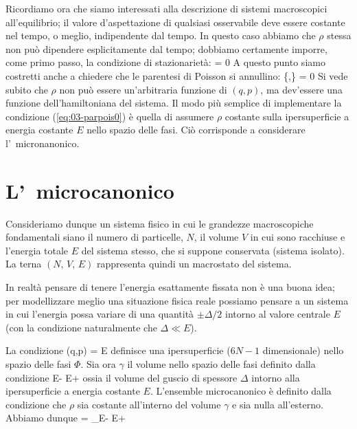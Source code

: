 Ricordiamo ora che siamo interessati alla descrizione di sistemi macroscopici all'equilibrio; il valore d'aspettazione di qualsiasi osservabile deve essere costante nel tempo, o meglio, indipendente dal tempo. In questo caso abbiamo che $\rho$ stessa non può dipendere esplicitamente dal tempo; dobbiamo certamente imporre, come primo passo, la condizione di stazionarietà:
\be
{} = 0
\ee
A questo punto siamo costretti anche a chiedere che le parentesi di Poisson si annullino:
\be
\label{eq:03-parpois0}
\{\rho,\Ham\} = 0
\ee
Si vede subito che $\rho$ non può essere un'arbitraria funzione di $(q,p)$, ma dev'essere una funzione dell'hamiltoniana del sistema. Il modo più semplice di implementare la condizione (\ref{eq:03-parpois0}) è quella di assumere $\rho$ costante sulla ipersuperficie a energia costante $E$ nello spazio delle fasi. Ciò corrisponde a considerare l'\ensemble\ micronanonico.

\section{L'\ensemble\ microcanonico}
\label{sec:03-micro}

Consideriamo dunque un sistema fisico in cui le grandezze macroscopiche fondamentali siano il numero di particelle, $N$, il volume $V$ in cui sono racchiuse e l'energia totale $E$ del sistema stesso, che si suppone conservata (sistema isolato). La terna $(N,\,V,\,E)$ rappresenta quindi un macrostato del sistema.

In realtà pensare di tenere l'energia esattamente fissata non è una buona idea; per modellizzare meglio una situazione fisica reale possiamo pensare a un sistema in cui l'energia possa variare di una quantità $\pm \Delta/2$ intorno al valore centrale $E$ (con la condizione naturalmente che $\Delta \ll E$).

La condizione
\be
\Ham(q,p) = E
\ee
definisce una ipersuperficie ($6N-1$ dimensionale) nello spazio delle fasi $\Phi$. Sia ora $\gamma$ il volume nello spazio delle fasi definito dalla condizione
\be
E- \le \Ham \le E+
\ee
ossia il volume del guscio di spessore $\Delta$ intorno alla ipersuperficie a energia costante $E$. L'ensemble microcanonico è definito dalla condizione che $\rho$ sia costante all'interno del volume $\gamma$ e sia nulla all'esterno. Abbiamo dunque
\be
\gamma = \int\limits_{E- \le \Ham \le E+}\dephi
\ee

